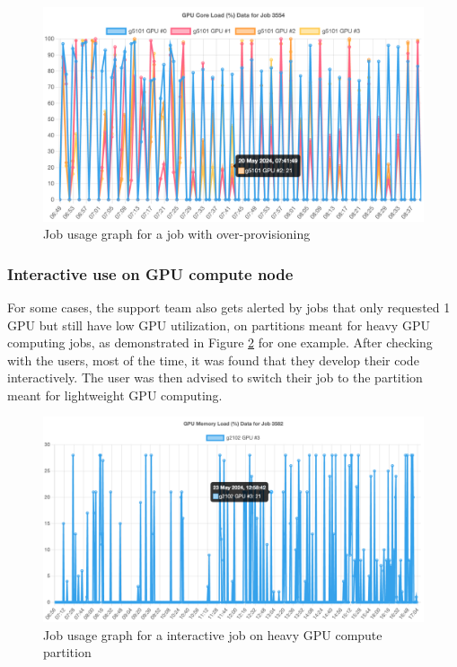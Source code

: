 \begin{figure}[H]
    \centering
    \includegraphics[width=1\textwidth]{figures/job-over-provison.png}
    \caption{Job usage graph for a job with over-provisioning}
    \label{fig_job_over_provison}
\end{figure}

\subsubsection{Interactive use on GPU compute node}
For some cases, the support team also gets alerted by jobs that only requested 1 GPU but still have low GPU utilization, on partitions meant for heavy GPU computing jobs, as demonstrated in Figure \ref{fig_job_interactive} for one example. After checking with the users, most of the time, it was found that they develop their code interactively. The user was then advised to switch their job to the partition meant for lightweight GPU computing.

\begin{figure}[H]
    \centering
    \includegraphics[width=1\textwidth]{figures/job-interactive.png}
    \caption{Job usage graph for a interactive job on heavy GPU compute partition}
    \label{fig_job_interactive}
\end{figure}

